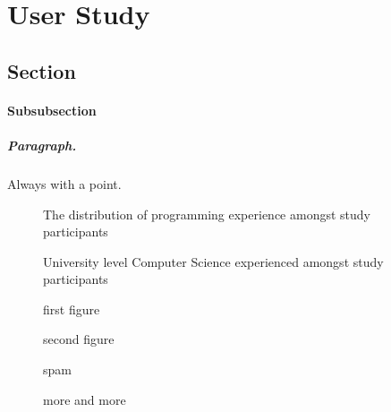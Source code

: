 \chapter{User Study}
\label{chap:userstudy}
\section{Section}
%
\subsubsection{Subsubsection}

\paragraph{Paragraph.} Always with a point.

\begin{figure}[H]
	\scalebox{0.75}{}
	\caption{The distribution of programming experience amongst study participants}
	\label{fig:programmingexp}
\end{figure}

\begin{figure}[H]
	\scalebox{1}{}
	\caption{University level Computer Science experienced amongst study participants}
	\label{fig:uniexp}
\end{figure}

\begin{figure}[H]
	\centering
	\begin{minipage}{0.45\textwidth}
		\centering
		\scalebox{0.7}{}
		\caption{first figure}
    \end{minipage}\hspace{-1em}
	\begin{minipage}{0.45\textwidth}
		\centering
		\scalebox{0.7}{}
		\caption{second figure}
	\end{minipage}
\end{figure}



\begin{figure}[H]
	\scalebox{0.72}{}
	\caption{spam}
	\label{fig:uniexp}
\end{figure}

\begin{figure}[H]
	\scalebox{0.72}{}
	\caption{more and more}
	\label{fig:moreandmore}
\end{figure}

